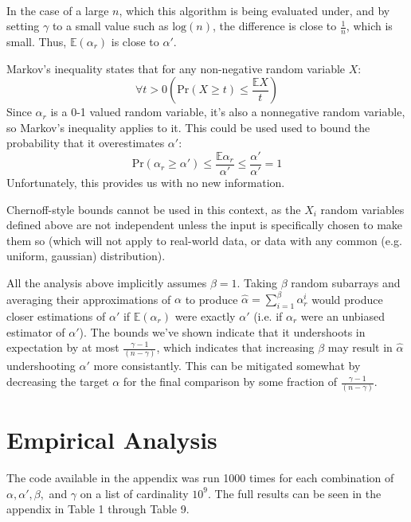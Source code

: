 \documentclass{article}
\begin{document}
\paragraph{}In the case of a large $n$, which this algorithm is being evaluated under, and by setting $\gamma$ to a small value such as $\text{log}(n)$, the difference is close to $\frac{1}{n}$, which is small.
 Thus, $\mathbb E(\alpha_{r})$ is close to $\alpha'$.

Markov's inequality states that for any non-negative random variable $X$:
\begin{equation*}
\forall t>0(\text{Pr}(X \ge t) \le \frac{\mathbb EX}{t})
\end{equation*}
Since $\alpha_r$ is a 0-1 valued random variable, it's also a nonnegative random variable, so Markov's inequality applies to it.
This could be used used to bound the probability that it overestimates $\alpha'$:
\begin{equation*}
\text{Pr}(\alpha_r \ge \alpha')
\le \frac{\mathbb E\alpha_r}{\alpha'}
\le \frac{\alpha'}{\alpha'} = 1
\end{equation*}
Unfortunately, this provides us with no new information.

Chernoff-style bounds cannot be used in this context, as the $X_i$ random variables defined above are not independent unless the input is specifically chosen to make them so (which will not apply to real-world data, or data with any common (e.g. uniform, gaussian) distribution).

All the analysis above implicitly assumes $\beta=1$.
Taking $\beta$ random subarrays and averaging their approximations of $\alpha$ to produce $\hat{\alpha} = \sum_{i=1}^\beta\alpha_r^i$ would produce closer estimations of $\alpha'$ if $\mathbb E(\alpha_r)$ were exactly $\alpha'$ (i.e. if $\alpha_r$ were an unbiased estimator of $\alpha'$).
The bounds we've shown indicate that it undershoots in expectation by at most $\frac{\gamma - 1}{(n - \gamma)}$, which indicates that increasing $\beta$ may result in $\hat{\alpha}$ undershooting $\alpha'$ more consistantly.
This can be mitigated somewhat by decreasing the target $\alpha$ for the final comparison by some fraction of $\frac{\gamma - 1}{(n - \gamma)}$.
\section{Empirical Analysis}
\paragraph{}The code available in the appendix was run 1000 times for each combination of $\alpha, \alpha', \beta,$ and $\gamma$ on a list of cardinality $10^9$.
 The full results can be seen in the appendix in Table 1 through Table 9.
\end{document}
